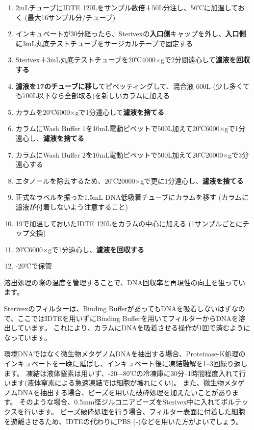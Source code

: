 \documentclass[titlepage,10pt,a4paper,uplatex]{jsbook}
\renewcommand{\textbf}[1]{{\bfseries\sffamily#1}}
\begin{document}
\begin{enumerate}
\item 2mLチューブにIDTE 120{\textmu}Lをサンプル数倍＋50{\textmu}L分注し、56℃に加温しておく (最大16サンプル分/チューブ)
\item インキュベートが30分経ったら、Sterivexの\textbf{入口側}キャップを外し、\textbf{入口側に}3mL丸底テストチューブをサージカルテープで固定する
\item Sterivex＋3mL丸底テストチューブを20℃4000×gで2分間遠心して\textbf{濾液を回収する}
\item \textbf{濾液を17のチューブに移し}てピペッティングして、混合液 600{\textmu}L (少し多くても700{\textmu}L以下なら全部取る)を新しいカラムに加える
\item カラムを20℃6000×gで1分遠心して\textbf{濾液を捨てる}
\item カラムにWash Buffer 1を10mL電動ピペットで500{\textmu}L加えて20℃6000×gで1分遠心し、\textbf{濾液を捨てる}
\item カラムにWash Buffer 2を10mL電動ピペットで500{\textmu}L加えて20℃20000×gで3分遠心する
\item エタノールを除去するため、20℃20000×gで更に1分遠心し、\textbf{濾液を捨てる}
\item 正式なラベルを振った1.5mL DNA低吸着チューブにカラムを移す (カラムに濾液が付着しないよう注意すること)
\item 19で加温しておいたIDTE 120{\textmu}Lをカラムの中心に加える (1サンプルごとにチップ交換)
\item 20℃6000×gで1分遠心し、\textbf{濾液を回収する}
\item -20℃で保管
\end{enumerate}

溶出処理の際の温度を管理することで、DNA回収率と再現性の向上を狙っています。

Sterivexのフィルターは、Binding BufferがあってもDNAを吸着しないはずなので、ここではIDTEを用いずにBinding Bufferを用いてフィルターからDNAを溶出しています。
これにより、カラムにDNAを吸着させる操作が1回で済むようになっています。

環境DNAではなく微生物メタゲノムDNAを抽出する場合、Proteinase-K処理のインキュベートを一晩に延ばし、インキュベート後に凍結融解を1--3回繰り返します。
凍結は液体窒素は用いず、{-20}--{-80}℃の冷凍庫に30分--1時間程度入れて行います(液体窒素による急速凍結では細胞が壊れにくい)。
また、微生物メタゲノムDNAを抽出する場合、ビーズを用いた破砕処理を加えたいことがあります。
そのような場合、0.5mm径ジルコニアビーズをSterivex中に入れてボルテックスを行います\citep{Ushio2019}。
ビーズ破砕処理を行う場合、フィルター表面に付着した細胞を遊離させるため、IDTEの代わりにPBS (-)などを用いた方がよいでしょう。
\end{document}
